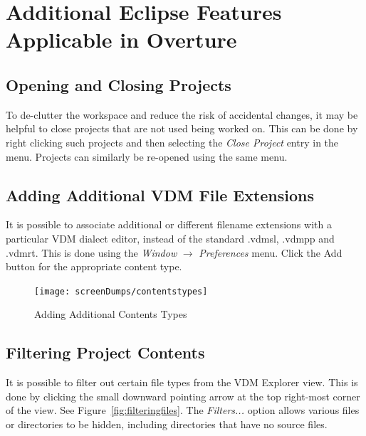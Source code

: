 \documentclass{overturerepchap}
\begin{document}
\section{Additional Eclipse Features Applicable in Overture}

\subsection{Opening and Closing Projects}

To de-clutter the workspace and reduce the risk of accidental changes,
it may be helpful to close projects that are not used being worked on.
This can be done by right clicking such projects and then selecting the
\emph{Close Project} entry in the menu. Projects can similarly be re-opened
using the same menu.


\subsection{Adding Additional VDM File Extensions}

It is possible to associate additional or different filename extensions with a
particular VDM dialect editor, instead of the standard {\ttfamily .vdmsl},
{\ttfamily .vdmpp} and {\ttfamily .vdmrt}. This is done using the \emph{Window}
$\rightarrow$ \emph{Preferences} menu. Click the Add
button for the appropriate content type.

\begin{figure}[!htb]
\begin{center}
\texttt{[image: screenDumps/contentstypes]}
\caption{Adding Additional Contents Types\label{fig:ContentsTypes}}
\end{center}
\end{figure}

\subsection{Filtering Project Contents}

It is possible to filter out certain file types from the VDM Explorer view.
This is done by clicking the small downward pointing arrow at the top
right-most corner of the view. See
Figure~\ref{fig:filteringfiles}. The \emph{Filters...} option allows
various files or directories to be hidden, including
directories that have no source files.
\end{document}
